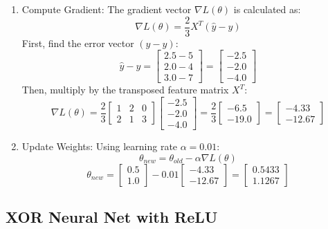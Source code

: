 \begin{enumerate}
    \item Compute Gradient:
    The gradient vector $\nabla L(\theta)$ is calculated as:
    $$\nabla L(\theta) = \frac{2}{3} X^T (\hat{y} - y)$$
    First, find the error vector $(\hat{y} - y)$:
    $$\hat{y} - y = \begin{bmatrix} 2.5 - 5 \\ 2.0 - 4 \\ 3.0 - 7 \end{bmatrix} = \begin{bmatrix} -2.5 \\ -2.0 \\ -4.0 \end{bmatrix}$$
    Then, multiply by the transposed feature matrix $X^T$:
    $$\nabla L(\theta) = \frac{2}{3} \begin{bmatrix} 1 & 2 & 0 \\ 2 & 1 & 3 \end{bmatrix} \begin{bmatrix} -2.5 \\ -2.0 \\ -4.0 \end{bmatrix} = \frac{2}{3} \begin{bmatrix} -6.5 \\ -19.0 \end{bmatrix} = \begin{bmatrix} -4.33 \\ -12.67 \end{bmatrix}$$

    \item Update Weights:
    Using learning rate $\alpha = 0.01$:
    $$\theta_{new} = \theta_{old} - \alpha \nabla L(\theta)$$
    $$\theta_{new} = \begin{bmatrix} 0.5 \\ 1.0 \end{bmatrix} - 0.01 \begin{bmatrix} -4.33 \\ -12.67 \end{bmatrix} = \begin{bmatrix} 0.5433 \\ 1.1267 \end{bmatrix}$$
\end{enumerate}


\newpage

\subsection{XOR Neural Net with ReLU}
\label{worked-XOR-relu-model}


